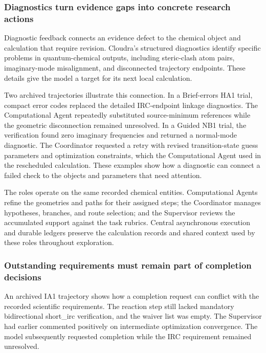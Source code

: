 \subsubsection{Diagnostics turn evidence gaps into concrete research actions}

Diagnostic feedback connects an evidence defect to the chemical object and calculation that require revision. Cloudra's structured diagnostics identify specific problems in quantum-chemical outputs, including steric-clash atom pairs, imaginary-mode misalignment, and disconnected trajectory endpoints. These details give the model a target for its next local calculation.

Two archived trajectories illustrate this connection. In a Brief-errors HA1 trial, compact error codes replaced the detailed IRC-endpoint linkage diagnostics. The Computational Agent repeatedly substituted source-minimum references while the geometric disconnection remained unresolved. In a Guided NB1 trial, the verification found zero imaginary frequencies and returned a normal-mode diagnostic. The Coordinator requested a retry with revised transition-state guess parameters and optimization constraints, which the Computational Agent used in the rescheduled calculation. These examples show how a diagnostic can connect a failed check to the objects and parameters that need attention.\citep{ref18}

The roles operate on the same recorded chemical entities. Computational Agents refine the geometries and paths for their assigned steps; the Coordinator manages hypotheses, branches, and route selection; and the Supervisor reviews the accumulated support against the task rubrics. Central asynchronous execution and durable ledgers preserve the calculation records and shared context used by these roles throughout exploration.

\subsubsection{Outstanding requirements must remain part of completion decisions}

An archived IA1 trajectory shows how a completion request can conflict with the recorded scientific requirements. The reaction step still lacked mandatory bidirectional short\_irc verification, and the waiver list was empty. The Supervisor had earlier commented positively on intermediate optimization convergence. The model subsequently requested completion while the IRC requirement remained unresolved.

